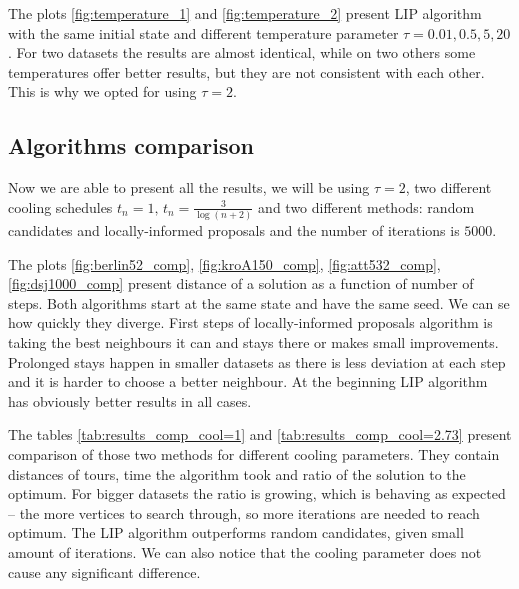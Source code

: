 	
	
	The plots \ref{fig:temperature_1} and \ref{fig:temperature_2} present LIP algorithm with the same initial state and different temperature parameter $\tau=0.01, 0.5, 5, 20$. For two datasets the results are almost identical, while on two others some temperatures offer better results, but they are not consistent with each other. This is why we opted for using $\tau=2$.
	
\subsection{Algorithms comparison}
	Now we are able to present all the results, we will be using $\tau=2$, two different cooling schedules $t_n=1, \, t_n=\frac{3}{\log(n+2)}$ and two different methods: random candidates and locally-informed proposals and the number of iterations is $5000$.
	
	
	
	The plots \ref{fig:berlin52_comp}, \ref{fig:kroA150_comp}, \ref{fig:att532_comp}, \ref{fig:dsj1000_comp} present distance of a solution as a function of number of steps. Both algorithms start at the same state and have the same seed. We can se how quickly they diverge. First steps of locally-informed proposals algorithm is taking the best neighbours it can and stays there or makes small improvements. Prolonged stays happen in smaller datasets as there is less deviation at each step and it is harder to choose a better neighbour. At the beginning LIP algorithm has obviously better results in all cases.
	
	
	
	The tables \ref{tab:results_comp_cool=1} and \ref{tab:results_comp_cool=2.73} present comparison of those two methods for different cooling parameters. They contain distances of tours, time the algorithm took and ratio of the solution to the optimum. For bigger datasets the ratio is growing, which is behaving as expected -- the more vertices to search through, so more iterations are needed to reach optimum. The LIP algorithm outperforms random candidates, given small amount of iterations. We can also notice that the cooling parameter does not cause any significant difference.